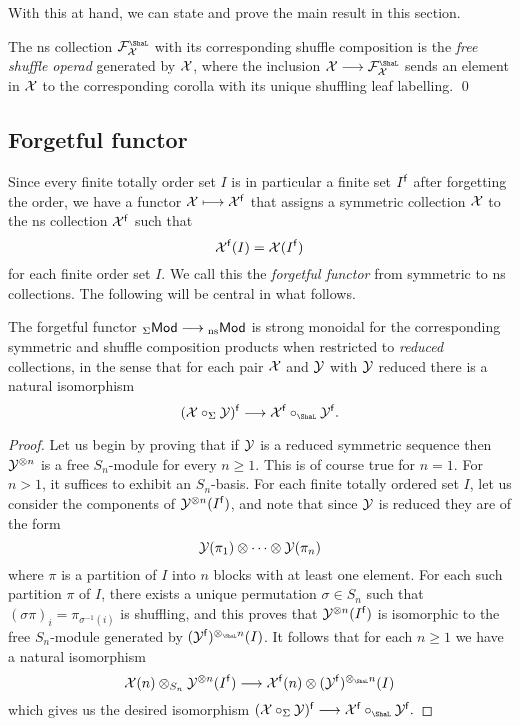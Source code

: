 With this at hand, we can state and prove the
main result in this section. 

\begin{proposition}
The ns collection
$\FF_\XX^\Sha$ with its corresponding
shuffle composition is the \emph{free shuffle
operad} generated by $\mathcal{X}$, where the
inclusion $\XX\longrightarrow \FF_\XX^\Sha$
sends an element in $\mathcal{X}$ to the corresponding
corolla with its unique shuffling leaf
labelling. \qed
\end{proposition}

\subsection{Forgetful functor}

Since every finite totally order 
set $I$ is in particular a finite set
$I^{\mathsf{f}}$
after forgetting the order,
we have a functor
$\mathcal{X} \longmapsto \mathcal{X}^{\mathsf{f}}$ that assigns
a symmetric collection $\mathcal{X}$ to the ns
collection $\mathcal{X}^{\mathsf{f}}$ such that
\[ \mathcal{X}^{\mathsf{f}}(I) = \mathcal{X}(I^{\mathsf{f}}) \]
for each finite order set $I$. 
We call this the \emph{forgetful functor}
from symmetric to ns collections. 
The following will be central in what
follows.

\begin{proposition}
The forgetful functor ${}_\Sigma\mathsf{Mod} \longrightarrow 
{}_{\mathrm{ns}}\mathsf{Mod}$ is strong monoidal for the corresponding 
symmetric and shuffle composition products
when restricted
to \emph{reduced} collections, in the sense
that for each pair $\mathcal{X}$ and $\mathcal{Y}$ with
$\mathcal{Y}$ reduced there is a natural isomorphism
\[
(\XX\circ_\Sigma \YY)^{\f} \longrightarrow
 \XX^{\f}\circ_\Sha \YY^{\f}.
\]
\end{proposition}

\begin{proof}
Let us begin by proving that if $\mathcal{Y}$ is a
reduced symmetric sequence then $\mathcal{Y}^{\otimes n}$
is a free $S_n$-module for every $n\geqslant 1$.
This is of course true for $n=1$. For $n>1$,
it suffices to exhibit an $S_n$-basis. 
For each finite totally ordered set $I$, let
us consider the components of $\mathcal{Y}^{\otimes n}(I^{\mathsf{f}})$,
and note that since $\mathcal{Y}$ is reduced they are of the form
\[
\mathcal{Y}(\pi_1)\otimes \cdots\otimes\mathcal{Y}(\pi_n)
\]
where $\pi$ is a partition of $I$ into $n$ blocks with
at least one element. For each such partition $\pi$
of $I$, there exists a unique permutation $\sigma\in S_n$
such that $(\sigma\pi)_i = \pi_{\sigma^{-1}(i)}$ is
shuffling, and this proves that $\mathcal{Y}^{\otimes n}(I^{\mathsf{f}})$ is
isomorphic to the free $S_n$-module generated
by $(\YY^{\f})^{\otimes_\Sha n}(I)$.
It follows that for each $n\geqslant 1$ we have a
natural isomorphism
\[ 
\XX(n)\otimes_{S_n}\YY^{\otimes n}(I^{\f})
 \longrightarrow 
  \XX^{\f}(n)\otimes (\YY^{\f})^{\otimes_\Sha n}(I)
\] 
which gives us the desired isomorphism
$
(\XX\circ_\Sigma \YY)^{\f} \longrightarrow
 \XX^{\f}\circ_\Sha \YY^{\f}.
$
\end{proof}

